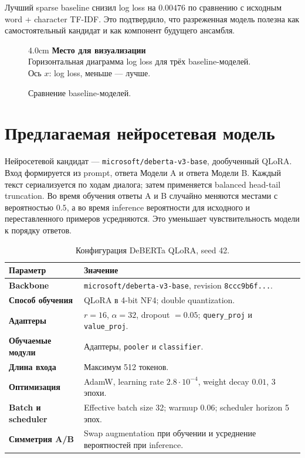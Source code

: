 \documentclass[a4paper,11pt]{article}
\newcommand{\visualplaceholder}[2]{%
  \begin{visualbox}{#1}
    \centering
    {\large\bfseries\color{accent} Место для визуализации}\\[0.45em]
    \textcolor{placeholder}{#2}
  \end{visualbox}%
}
\begin{document}
Лучший sparse baseline снизил log loss на $0.00476$ по сравнению с исходным
word + character TF-IDF. Это подтвердило, что разреженная модель полезна как
самостоятельный кандидат и как компонент будущего ансамбля.

\begin{figure}[H]
\centering
\visualplaceholder{4.0cm}{
Горизонтальная диаграмма log loss для трёх baseline-моделей.\\
Ось $x$: log loss, меньше --- лучше.}
\caption{Сравнение baseline-моделей.}
\label{fig:baseline-comparison}
\end{figure}

\section{Предлагаемая нейросетевая модель}

Нейросетевой кандидат --- \texttt{microsoft/deberta-v3-base}, дообученный
QLoRA. Вход формируется из prompt, ответа Модели A и ответа Модели B. Каждый
текст сериализуется по ходам диалога; затем применяется balanced head-tail
truncation. Во время обучения ответы A и B случайно меняются местами с
вероятностью $0.5$, а во время inference вероятности для исходного и
переставленного примеров усредняются. Это уменьшает чувствительность модели к
порядку ответов.

\begin{table}[H]
\centering
\caption{Конфигурация DeBERTa QLoRA, seed 42.}
\label{tab:deberta-card}
\small
\begin{tabularx}{\textwidth}{|>{\bfseries}p{}|X|}
\hline
\rowcolor{lightblue} Параметр & Значение \\ \hline
Backbone & \texttt{microsoft/deberta-v3-base}, revision \texttt{8ccc9b6f...}. \\ \hline
Способ обучения & QLoRA в 4-bit NF4; double quantization. \\ \hline
Адаптеры & $r=16$, $\alpha=32$, dropout $=0.05$; \texttt{query\_proj} и \texttt{value\_proj}. \\ \hline
Обучаемые модули & Адаптеры, \texttt{pooler} и \texttt{classifier}. \\ \hline
Длина входа & Максимум 512 токенов. \\ \hline
Оптимизация & AdamW, learning rate $2.8\cdot10^{-4}$, weight decay $0.01$, 3 эпохи. \\ \hline
Batch и scheduler & Effective batch size 32; warmup 0.06; scheduler horizon 5 эпох. \\ \hline
Симметрия A/B & Swap augmentation при обучении и усреднение вероятностей при inference. \\ \hline
\end{tabularx}
\end{table}
\end{document}

